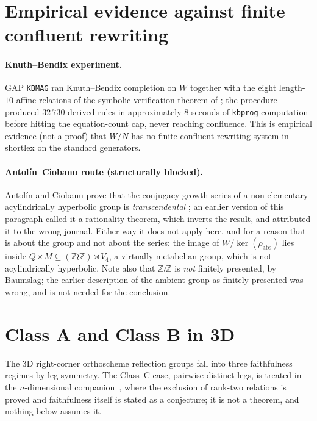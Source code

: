 \documentclass[11pt,a4paper]{article}
\theoremstyle{remark}
\theoremstyle{plain}
\begin{document}
\section{Empirical evidence against finite confluent rewriting}
\label{sec:rewriting}

\paragraph{Knuth--Bendix experiment.}
GAP \texttt{KBMAG} ran Knuth--Bendix completion on $W$ together with
the eight length-$10$ affine relations of the symbolic-verification theorem of \cite{Bonfioli2};
the procedure produced $32\,730$ derived rules in approximately $8$
seconds of \texttt{kbprog} computation before hitting the equation-count
cap, never reaching confluence.  This is empirical evidence (not a
proof) that $W/N$ has no finite confluent rewriting system in shortlex
on the standard generators.

\paragraph{Antol\'in--Ciobanu route (structurally blocked).}
Antol\'in and Ciobanu prove that the conjugacy-growth series of a
non-elementary acylindrically hyperbolic group is \emph{transcendental}
\cite{AntolinCiobanu}; an earlier version of this paragraph called it a
rationality theorem, which inverts the result, and attributed it to the
wrong journal. Either way it does not apply here, and for a reason that
is about the group and not about the series: the image of
$W/\ker(\rho_{\mathrm{abs}})$ lies inside
$Q \ltimes M \subseteq (\mathbb{Z}\wr\mathbb{Z})\rtimes V_4$, a virtually
metabelian group, which is not acylindrically hyperbolic. Note also that
$\mathbb{Z}\wr\mathbb{Z}$ is \emph{not} finitely presented, by Baumslag;
the earlier description of the ambient group as finitely presented was
wrong, and is not needed for the conclusion.

\section{Class A and Class B in 3D}
\label{sec:classes-AB}

The 3D right-corner orthoscheme reflection groups fall into three
faithfulness regimes by leg-symmetry. The Class~C case, pairwise distinct
legs, is treated in the $n$-dimensional companion~\cite{Bonfioli1b},
where the exclusion of rank-two relations is proved and faithfulness
itself is stated as a conjecture; it is not a theorem, and nothing below
assumes it.
\end{document}
